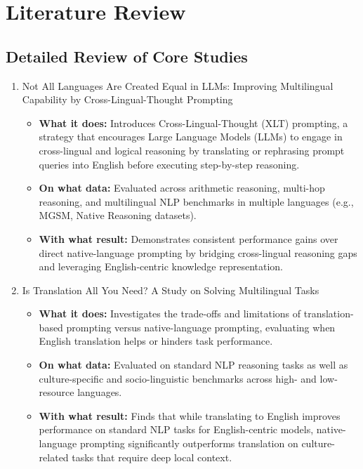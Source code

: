 \documentclass{article}
\begin{document}
\section*{Literature Review}

\subsection*{Detailed Review of Core Studies}

\begin{enumerate}
    \item Not All Languages Are Created Equal in LLMs: Improving Multilingual Capability by Cross-Lingual-Thought Prompting \textbf{\cite{huang-etal-2023-languages}}
    \begin{itemize}
        \item \textbf{What it does:} Introduces Cross-Lingual-Thought (XLT) prompting, a strategy that encourages Large Language Models (LLMs) to engage in cross-lingual and logical reasoning by translating or rephrasing prompt queries into English before executing step-by-step reasoning.
        \item \textbf{On what data:} Evaluated across arithmetic reasoning, multi-hop reasoning, and multilingual NLP benchmarks in multiple languages (e.g., MGSM, Native Reasoning datasets).
        \item \textbf{With what result:} Demonstrates consistent performance gains over direct native-language prompting by bridging cross-lingual reasoning gaps and leveraging English-centric knowledge representation.
    \end{itemize}

    \item Is Translation All You Need? A Study on Solving Multilingual Tasks \textbf{\cite{liu-etal-2025-translation}}
    \begin{itemize}
        \item \textbf{What it does:} Investigates the trade-offs and limitations of translation-based prompting versus native-language prompting, evaluating when English translation helps or hinders task performance.
        \item \textbf{On what data:} Evaluated on standard NLP reasoning tasks as well as culture-specific and socio-linguistic benchmarks across high- and low-resource languages.
        \item \textbf{With what result:} Finds that while translating to English improves performance on standard NLP tasks for English-centric models, native-language prompting significantly outperforms translation on culture-related tasks that require deep local context.
    \end{itemize}


\end{enumerate}
\end{document}
